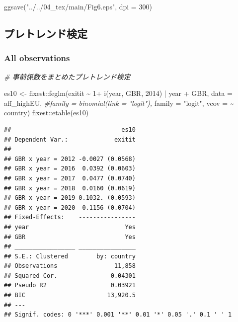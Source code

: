 \documentclass[
]{article}
\newenvironment{Shaded}{\begin{snugshade}}{\end{snugshade}}
\newcommand{\AttributeTok}[1]{\textcolor[rgb]{0.77,0.63,0.00}{#1}}
\newcommand{\CommentTok}[1]{\textcolor[rgb]{0.56,0.35,0.01}{\textit{#1}}}
\newcommand{\DecValTok}[1]{\textcolor[rgb]{0.00,0.00,0.81}{#1}}
\newcommand{\FunctionTok}[1]{\textcolor[rgb]{0.00,0.00,0.00}{#1}}
\newcommand{\NormalTok}[1]{#1}
\newcommand{\OtherTok}[1]{\textcolor[rgb]{0.56,0.35,0.01}{#1}}
\newcommand{\SpecialCharTok}[1]{\textcolor[rgb]{0.00,0.00,0.00}{#1}}
\newcommand{\StringTok}[1]{\textcolor[rgb]{0.31,0.60,0.02}{#1}}
\begin{document}
\begin{Shaded}
\begin{Highlighting}[]
\FunctionTok{ggsave}\NormalTok{(}\StringTok{"../../04\_tex/main/Fig6.eps"}\NormalTok{, }\AttributeTok{dpi =} \DecValTok{300}\NormalTok{)}
\end{Highlighting}
\end{Shaded}

\hypertarget{ux30d7ux30ecux30c8ux30ecux30f3ux30c9ux691cux5b9a}{%
\subsection{プレトレンド検定}\label{ux30d7ux30ecux30c8ux30ecux30f3ux30c9ux691cux5b9a}}

\hypertarget{all-observations}{%
\subsubsection*{All observations}\label{all-observations}}

\begin{Shaded}
\begin{Highlighting}[]
\CommentTok{\# 事前係数をまとめたプレトレンド検定}

\NormalTok{es10 }\OtherTok{\textless{}{-}}\NormalTok{ fixest}\SpecialCharTok{::}\FunctionTok{feglm}\NormalTok{(exitit }\SpecialCharTok{\textasciitilde{}} \DecValTok{1}\SpecialCharTok{+} \FunctionTok{i}\NormalTok{(year, GBR, }\DecValTok{2014}\NormalTok{) }
                       \SpecialCharTok{|}\NormalTok{ year }\SpecialCharTok{+}\NormalTok{ GBR, }
               \AttributeTok{data =}\NormalTok{ aff\_highEU,}
               \CommentTok{\#family = binomial(link = "logit"),}
               \AttributeTok{family =} \StringTok{"logit"}\NormalTok{,}
               \AttributeTok{vcov =} \SpecialCharTok{\textasciitilde{}}\NormalTok{ country)}
\NormalTok{fixest}\SpecialCharTok{::}\FunctionTok{etable}\NormalTok{(es10)}
\end{Highlighting}
\end{Shaded}

\begin{verbatim}
##                               es10
## Dependent Var.:             exitit
##                                   
## GBR x year = 2012 -0.0027 (0.0568)
## GBR x year = 2016  0.0392 (0.0603)
## GBR x year = 2017  0.0477 (0.0740)
## GBR x year = 2018  0.0160 (0.0619)
## GBR x year = 2019 0.1032. (0.0593)
## GBR x year = 2020  0.1156 (0.0704)
## Fixed-Effects:    ----------------
## year                           Yes
## GBR                            Yes
## _________________ ________________
## S.E.: Clustered        by: country
## Observations                11,858
## Squared Cor.               0.04301
## Pseudo R2                  0.03921
## BIC                       13,920.5
## ---
## Signif. codes: 0 '***' 0.001 '**' 0.01 '*' 0.05 '.' 0.1 ' ' 1
\end{verbatim}
\end{document}
